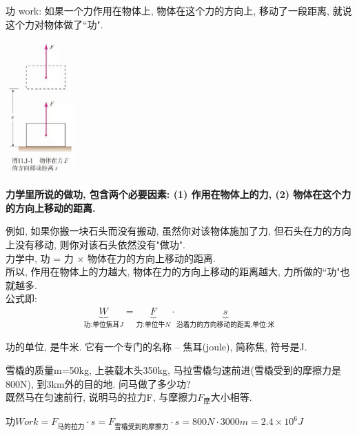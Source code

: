 \documentclass[UTF8]{ctexart}
\begin{document}
功 work: 如果一个力作用在物体上, 物体在这个力的方向上, 移动了一段距离, 就说这个力对物体做了``功".

\includegraphics[width=0.2\textwidth]{img/0045.png}

\textbf{力学里所说的做功, 包含两个必要因素: (1) 作用在物体上的力, (2) 物体在这个力的方向上移动的距离.}

例如, 如果你搬一块石头而没有搬动, 虽然你对该物体施加了力, 但石头在力的方向上没有移动, 则你对该石头依然没有"做功". \\

力学中, 功 = 力 × 物体在力的方向上移动的距离. \\
所以, 作用在物体上的力越大, 物体在力的方向上移动的距离越大, 力所做的``功"也就越多. \\

公式即:
\begin{align*}
	\boxed{
		\underset{\text{功:单位焦耳}J}{\underbrace{W}}=\underset{\text{力:单位牛}N}{\underbrace{F}}\cdot \underset{\text{沿着力的方向移动的距离,单位:米}}{\underbrace{s}}		
	}
\end{align*}

功的单位, 是牛米. 它有一个专门的名称 -- 焦耳(joule), 简称焦, 符号是J. \\



\begin{tcolorbox}[title = {例},boxrule={0.1em},colframe={black!10}, colback={black!3},colbacktitle={black!10},coltitle={black}]
雪橇的质量m=50kg, 上装载木头350kg, 马拉雪橇匀速前进(雪橇受到的摩擦力是800N), 到3km外的目的地. 问马做了多少功? \\
既然马在匀速前行, 说明马的拉力F, 与摩擦力$F_摩$大小相等.

$
\text{功}Work=F_{\text{马的拉力}}\cdot s=F_{\text{雪橇受到的摩擦力}}\cdot s=800N\cdot 3000m=2.4\times 10^6J
$
\end{tcolorbox}
	
	\vspace{1em} 
	
\end{document}
